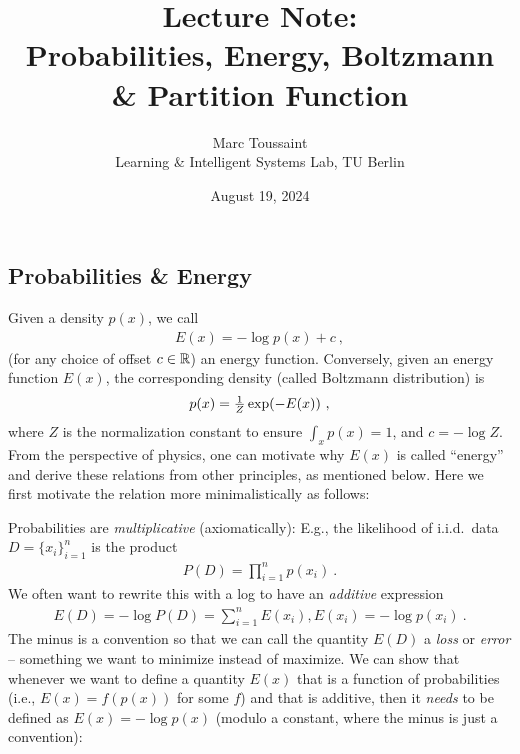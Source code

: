 
\note

\title{Lecture Note:\\ Probabilities, Energy, Boltzmann \& Partition Function}
\author{Marc Toussaint\\\small Learning \& Intelligent Systems Lab, TU Berlin}
\date{August 19, 2024}

\makeatletter
\renewcommand{\@seccntformat}[1]{}
\makeatother

\notetitle


\subsection{Probabilities \& Energy}

Given a density $p(x)$, we call
\begin{align}
E(x) = -\log p(x) + c ~,
\end{align}
(for any choice of offset $c\in{\mathbb{R}}$) an energy function. Conversely, given an energy function $E(x)$, the corresponding density (called Boltzmann distribution) is
\begin{align}
p(x) = \textstyle\frac 1Z \exp(-E(x)) ~,
\end{align}
where $Z$ is the normalization constant to ensure $\int_x p(x) = 1$,
and $c=-\log Z$. From the perspective of physics, one can motivate why
$E(x)$ is called ``energy'' and derive these relations from other
principles, as mentioned below. Here we first motivate the
relation more minimalistically as follows:

Probabilities are \emph{multiplicative} (axiomatically): E.g., the likelihood of i.i.d.\ data $D = \lbrace x_i \rbrace_{i=1}^n$ is the product
\begin{align}
P(D) = \prod_{i=1}^n p(x_i) ~.
\end{align}
We often want to rewrite this with a log to have an \emph{additive} expression
\begin{align}
E(D) = -\log P(D) = \sum_{i=1}^n E(x_i) \comma E(x_i) = -\log p(x_i) ~.
\end{align}
The minus is a convention so that we can call the quantity $E(D)$
a \emph{loss} or \emph{error} -- something we want to minimize instead
of maximize. We can show that whenever we want to define a
quantity $E(x)$ that is a function of probabilities (i.e., $E(x) =
f(p(x))$ for some $f$) and that is additive, then it \emph{needs} to
be defined as $E(x) = -\log p(x)$ (modulo a constant, where the minus
is just a convention):


